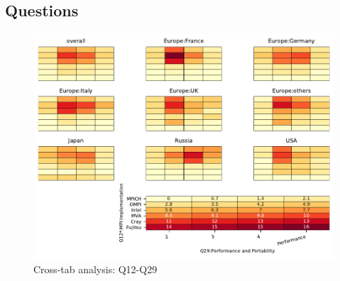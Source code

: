 
\subsection{Questions}


\begin{figure}
\begin{center}
\includegraphics[width=12cm]{../pdfs/Q12-Q29.pdf}
\caption{Cross-tab analysis: Q12-Q29}
\label{fig:Q12-Q29}
\end{center}
\end{figure}
